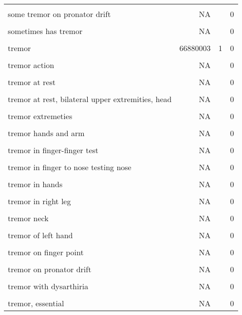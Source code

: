 \documentclass[10pt, letterpaper]{article}
\begin{document}
\begin{spacing}{1.0}
\begin{footnotesize}
\begin{longtable}[H]{p{4in}rrr}
        & & &\\[-6pt]
        some tremor on pronator drift & NA &  & 0\\
        & & &\\[-6pt]
        sometimes has tremor & NA &  & 0\\
        & & &\\[-6pt]
        tremor & 66880003 & 1 & 0\\
        & & &\\[-6pt]
        tremor action & NA &  & 0\\
        & & &\\[-6pt]
        tremor at rest & NA &  & 0\\
        & & &\\[-6pt]
        tremor at rest, bilateral upper extremities, head & NA &  & 0\\
        & & &\\[-6pt]
        tremor extremeties & NA &  & 0\\
        & & &\\[-6pt]
        tremor hands and arm & NA &  & 0\\
        & & &\\[-6pt]
        tremor in finger-finger test & NA &  & 0\\
        & & &\\[-6pt]
        tremor in finger to nose testing nose & NA &  & 0\\
        & & &\\[-6pt]
        tremor in hands & NA &  & 0\\
        & & &\\[-6pt]
        tremor in right leg & NA &  & 0\\
        & & &\\[-6pt]
        tremor neck & NA &  & 0\\
        & & &\\[-6pt]
        tremor of left hand & NA &  & 0\\
        & & &\\[-6pt]
        tremor on finger point & NA &  & 0\\
        & & &\\[-6pt]
        tremor on pronator drift & NA &  & 0\\
        & & &\\[-6pt]
        tremor with dysarthiria & NA &  & 0\\
        & & &\\[-6pt]
        tremor, essential & NA &  & 0\\

\end{longtable}
\end{footnotesize}
\end{spacing}
\end{document}
